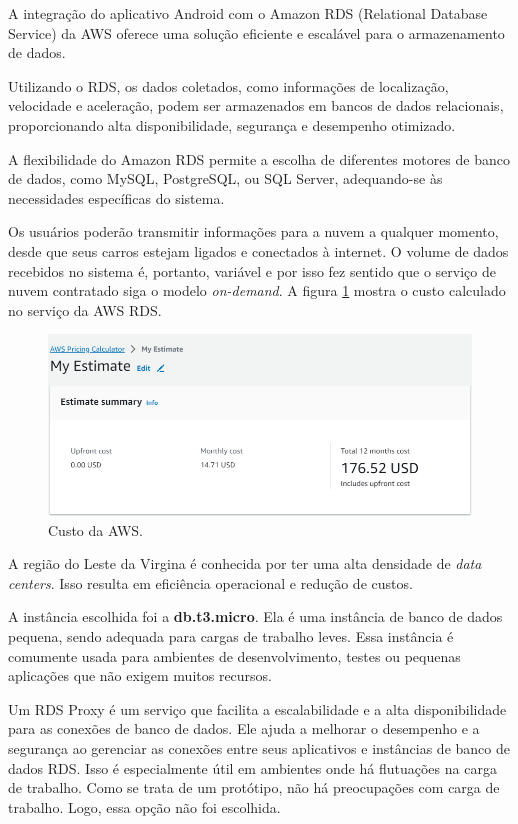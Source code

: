 A integração do aplicativo Android com o Amazon RDS (Relational Database Service) da AWS oferece uma solução eficiente e escalável para o armazenamento de dados. 

Utilizando o RDS, os dados coletados, como informações de localização, velocidade e aceleração, podem ser armazenados em bancos de dados relacionais, proporcionando alta disponibilidade, segurança e desempenho otimizado. 

A flexibilidade do Amazon RDS permite a escolha de diferentes motores de banco de dados, como MySQL, PostgreSQL, ou SQL Server, adequando-se às necessidades específicas do sistema.

Os usuários poderão transmitir informações para a nuvem a qualquer momento, desde que seus carros estejam ligados e conectados à internet. O volume de dados recebidos no sistema é, portanto, variável e por isso fez sentido que o serviço de nuvem contratado siga o modelo \textit{on-demand}. A figura \ref{figure:custo_aws_inicial} mostra o custo calculado no serviço da AWS RDS.

\begin{figure}[hp]
    \centering
    
    \includegraphics[scale=0.8]{figures/custo_aws_inicial.PNG}
    \caption{Custo da AWS.}
    \label{figure:custo_aws_inicial}
    
\end{figure}

A região do Leste da Virgina é conhecida por ter uma alta densidade de \textit{data centers}. Isso resulta em eficiência operacional e redução de custos.

A instância escolhida foi a \textbf{db.t3.micro}. Ela é uma instância de banco de dados pequena, sendo adequada para cargas de trabalho leves. Essa instância é comumente usada para ambientes de desenvolvimento, testes ou pequenas aplicações que não exigem muitos recursos.

Um RDS Proxy é um serviço que facilita a escalabilidade e a alta disponibilidade para as conexões de banco de dados. Ele ajuda a melhorar o desempenho e a segurança ao gerenciar as conexões entre seus aplicativos e instâncias de banco de dados RDS. Isso é especialmente útil em ambientes onde há flutuações na carga de trabalho. Como se trata de um protótipo, não há preocupações com carga de trabalho. Logo, essa opção não foi escolhida.

